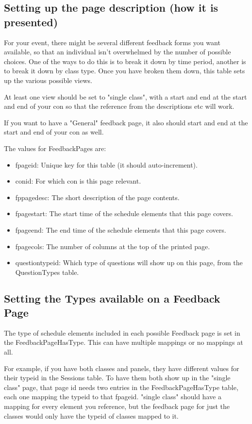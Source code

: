 \documentclass[captions=tablesignature]{scrartcl}
\begin{document}
\subsection{Setting up the page description (how it is presented)}
\label{sec-15-1}

For your event, there might be several different feedback forms you
want available, so that an individual isn't overwhelmed by the
number of possible choices.  One of the ways to do this is to break
it down by time period, another is to break it down by class type.
Once you have broken them down, this table sets up the various
possible views.

At least one view should be set to "single class", with a start and
end at the start and end of your con so that the reference from the
descriptions etc will work.

If you want to have a "General" feedback page, it also should start
and end at the start and end of your con as well.

The values for FeedbackPages are:
\begin{itemize}
\item fpageid: Unique key for this table (it should auto-increment).
\item conid: For which con is this page relevant.
\item fppagedesc: The short description of the page contents.
\item fpagestart: The start time of the schedule elements that this
page covers.
\item fpageend: The end time of the schedule elements that this page
covers.
\item fpagecols: The number of columns at the top of the printed page.
\item questiontypeid: Which type of questions will show up on this
page, from the QuestionTypes table.
\end{itemize}

\subsection{Setting the Types available on a Feedback Page}
\label{sec-15-2}

The type of schedule elements included in each possible Feedback
page is set in the FeedbackPageHasType.  This can have multiple
mappings or no mappings at all.

For example, if you have both classes and panels, they have
different values for their typeid in the Sessions table.  To have
them both show up in the "single class" page, that page id needs
two entries in the FeedbackPageHasType table, each one mapping the
typeid to that fpageid.  "single class" should have a mapping for
every element you reference, but the feedback page for just the
classes would only have the typeid of classes mapped to it.
\end{document}
